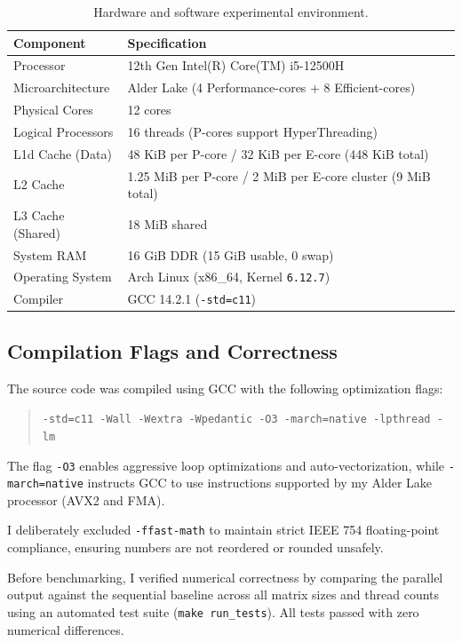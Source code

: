 \documentclass[11pt,a4paper]{article}
\begin{document}
\begin{table}[h!]
\centering
\small
\begin{tabular}{ll}
\toprule
\textbf{Component} & \textbf{Specification} \\
\midrule
Processor & 12th Gen Intel(R) Core(TM) i5-12500H \\
Microarchitecture & Alder Lake (4 Performance-cores + 8 Efficient-cores) \\
Physical Cores & 12 cores \\
Logical Processors & 16 threads (P-cores support HyperThreading) \\
L1d Cache (Data) & 48 KiB per P-core / 32 KiB per E-core (448 KiB total) \\
L2 Cache & 1.25 MiB per P-core / 2 MiB per E-core cluster (9 MiB total) \\
L3 Cache (Shared) & 18 MiB shared \\
System RAM & 16 GiB DDR (15 GiB usable, 0 swap) \\
Operating System & Arch Linux (x86\_64, Kernel \texttt{6.12.7}) \\
Compiler & GCC 14.2.1 (\texttt{-std=c11}) \\
\bottomrule
\end{tabular}
\caption{Hardware and software experimental environment.}
\label{tab:hardware}
\end{table}

\subsection{Compilation Flags and Correctness}
The source code was compiled using GCC with the following optimization flags:
\begin{quote}
\texttt{-std=c11 -Wall -Wextra -Wpedantic -O3 -march=native -lpthread -lm}
\end{quote}
The flag \texttt{-O3} enables aggressive loop optimizations and auto-vectorization, while \texttt{-march=native} instructs GCC to use instructions supported by my Alder Lake processor (AVX2 and FMA).

I deliberately excluded \texttt{-ffast-math} to maintain strict IEEE 754 floating-point compliance, ensuring numbers are not reordered or rounded unsafely.

Before benchmarking, I verified numerical correctness by comparing the parallel output against the sequential baseline across all matrix sizes and thread counts using an automated test suite (\texttt{make run\_tests}). All tests passed with zero numerical differences.
\end{document}
